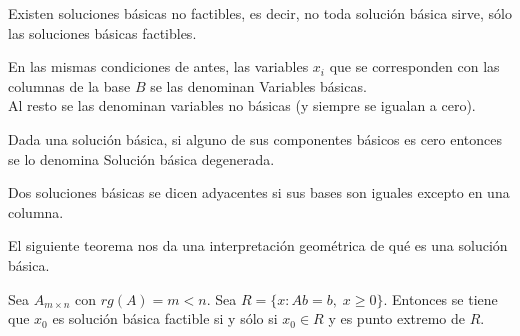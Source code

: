 \begin{nota}
  Existen soluciones básicas no factibles, es decir, no toda solución básica sirve, sólo las soluciones básicas factibles.
\end{nota}

\begin{definicion}
  En las mismas condiciones de antes, las variables $x_i$ que se
  corresponden con las columnas de la base $B$ se las denominan
  Variables básicas. \\
  
  Al resto se las denominan variables no básicas (y siempre se igualan a cero).
\end{definicion}

\begin{definicion}
  Dada una solución básica, si alguno de sus componentes básicos es cero entonces se lo denomina Solución básica degenerada.
\end{definicion}

\begin{definicion}
  Dos soluciones básicas se dicen adyacentes si sus bases son iguales excepto en una columna.
\end{definicion}

\begin{nota}
  El siguiente teorema nos da una interpretación geométrica de qué es una solución básica.
\end{nota}

\begin{teorema}
  Sea $A_{m\times n}$ con $rg(A)=m<n$. Sea
  $R=\{x:Ab=b,\;x\ge0\}$. Entonces se tiene que $x_0$ es solución
  básica factible si y sólo si $x_0\in R$ y es punto extremo de $R$.
\end{teorema}

